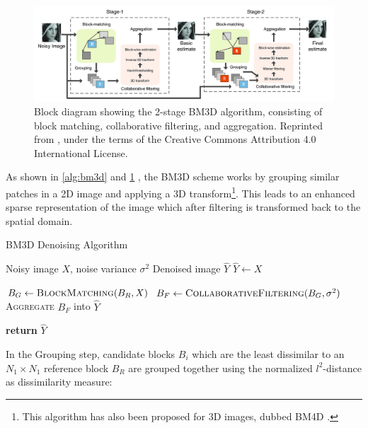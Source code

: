 \begin{figure}
    \centering
    \includegraphics[width=1\linewidth]{images/bm3d_schematic.png}
    \caption{Block diagram showing the 2-stage \gls{BM3D} algorithm, consisting of block matching, collaborative filtering, and aggregation. Reprinted from \cite{wangFPGABasedHardwareAccelerator2020}, under the terms of the Creative Commons Attribution 4.0 International License.}
    \label{fig:bm3d-schematic}
\end{figure}


As shown in \cref{alg:bm3d} and \cref{fig:bm3d-schematic}
, the \gls{BM3D} scheme works by grouping similar patches in a 2D image and applying a 3D transform\footnote{This algorithm has also been proposed for 3D images, dubbed BM4D \cite{mNonlocalTransformdomainFilter}.}. This leads to an enhanced sparse representation of the image which after filtering is transformed back to the spatial domain.
\begin{algorithm}
    \caption{BM3D Denoising Algorithm}\label{alg:bm3d}
    \begin{algorithmic}[1]
    \Require Noisy image $X$, noise variance $\sigma^2$
    \Ensure Denoised image $\hat{Y}$
    \Statex
        \State $\hat{Y} \gets X$
        
            \State $B_{G} \gets \textsc{BlockMatching}(B_R, X)$
            \State $B_{F} \gets \textsc{CollaborativeFiltering}(B_{G}, \sigma^2)$
            \State \textsc{Aggregate} $B_{F}$ into $\hat{Y}$
        \EndFor
        
        \State \textbf{return} $\hat{Y}$
    \EndProcedure
    \end{algorithmic}
\end{algorithm}

In the Grouping step, candidate blocks $B_i$ which are the least dissimilar to an $N_1 \times N_1$ reference block $B_R$ are grouped together using the normalized $l^2$-distance as dissimilarity measure:

